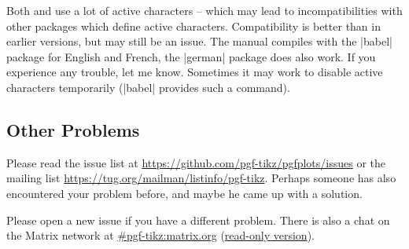 Both \PGF{} and \PGFPlots{} use a lot of active characters -- which may lead to
incompatibilities with other packages which define active characters.
Compatibility is better than in earlier versions, but may still be an issue.
The manual compiles with the |babel| package for English and French, the
|german| package does also work. If you experience any trouble, let me know.
Sometimes it may work to disable active characters temporarily (|babel|
provides such a command).


\subsection{Other Problems}

Please read the issue list at \url{https://github.com/pgf-tikz/pgfplots/issues}
or the mailing list \url{https://tug.org/mailman/listinfo/pgf-tikz}. Perhaps
someone has also encountered your problem before, and maybe he came up with a
solution.

Please open a new issue if you have a different problem. There is also a chat
on the Matrix network at
\href{https://matrix.to/#/#pgf-tikz:matrix.org}{#pgf-tikz:matrix.org}
(\href{https://view.matrix.org/room/!NuxCISwYQJuyWwNsEI:matrix.org/}{read-only version}).

